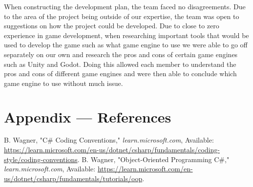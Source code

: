 \documentclass{article}
\begin{document}
\begin{enumerate}
    When constructing the development plan, the team faced no disagreements. Due to the area of the project being outside of our expertise, the team was open to suggestions on how the project could be developed. Due to close to zero experience in game development, when researching important tools that would be used to develop the game such as what game engine to use we were able to go off separately on our own and research the pros and cons of certain game engines such as Unity and Godot. Doing this allowed each member to understand the pros and cons of different game engines and were then able to conclude which game engine to use without much issue.
\end{enumerate}

\newpage{}

\section*{Appendix --- References}

\begin{flushleft}
  [1] B. Wagner, "C\# Coding Conventions," \textit{learn.microsoft.com}, Available: \url{https://learn.microsoft.com/en-us/dotnet/csharp/fundamentals/coding-style/coding-conventions}.
  \newline
  [2] B. Wagner, "Object-Oriented Programming C\#," \textit{learn.microsoft.com}, Available: \url{https://learn.microsoft.com/en-us/dotnet/csharp/fundamentals/tutorials/oop}.
\end{flushleft}
\end{document}
